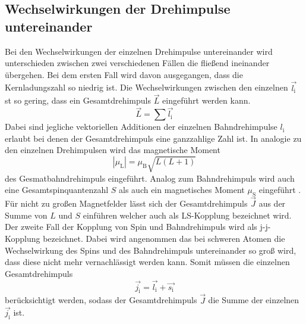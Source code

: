 \subsection{Wechselwirkungen der Drehimpulse untereinander}
Bei den Wechselwirkungen der einzelnen Drehimpulse untereinander wird unterschieden zwischen zwei verschiedenen Fällen die fließend ineinander übergehen.  Bei dem ersten Fall wird davon ausgegangen, dass die Kernladungszahl so niedrig ist. Die Wechselwirkungen zwischen den einzelnen $\vec{l_\text{i}}$ st so gering, dass ein Gesamtdrehimpuls $\vec{L}$ eingeführt werden kann.
\begin{equation}
  \vec{L} = \sum \vec{l_\text{i}}
  \label{eqn:L}
\end{equation}
Dabei sind jegliche vektoriellen Additionen der einzelnen Bahndrehimpulse $l_\text{i}$ erlaubt bei denen der Gesamtdrehimpuls eine ganzzahlige Zahl ist. In analogie zu den einzelnen Drehimpulsen wird das magnetische Moment
\begin{equation}
  |\mu_\text{L}| = \mu_\text{B} \sqrt{L(L+1)}
  \label{magL}
\end{equation}
des Gesmatbahndrehimpuls eingeführt. Analog zum Bahndrehimpuls wird auch eine Gesamtspinquantenzahl $S$ als auch ein magnetisches Moment $\mu_\text{S}$ eingeführt . Für nicht zu großen Magnetfelder lässt sich der Gesamtdrehimpuls $\vec{J}$ aus der Summe von $L$ und $S$ einführen welcher auch als LS-Kopplung bezeichnet wird.
Der zweite Fall der Kopplung von Spin und Bahndrehimpuls wird als j-j-Kopplung bezeichnet. Dabei wird angenommen das bei schweren Atomen die Wechselwirkung des Spins und des Bahndrehimpuls untereinander so groß wird, dass diese nicht mehr vernachlässigt werden kann. Somit müssen die einzelnen Gesamtdrehimpuls
\begin{equation}
  \vec{j_\text{i}} = \vec{l_\text{i}} + \vec{s_\text{i}}
  \label{eqn:j}
\end{equation}
berücksichtigt werden, sodass der Gesamtdrehimpuls $\vec{J}$ die Summe der einzelnen $\vec{j_\text{i}}$ ist.

